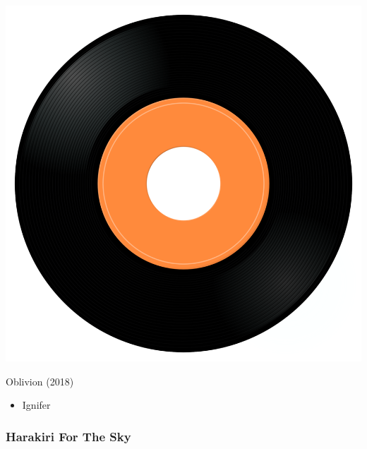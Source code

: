 \begin{minipage}[t]{0.25\textwidth}
\captionsetup{type=figure}
\includegraphics[width=\textwidth]{Images/cover.png}
\caption*{Oblivion (2018)}
\end{minipage}
\begin{minipage}[t]{0.25\textwidth}\vspace{0pt}
\begin{itemize}[nosep,leftmargin=1em,labelwidth=*,align=left]
	\setlength{\itemsep}{0pt}
	\item Ignifer
\end{itemize}
\end{minipage}


\subsubsection{Harakiri For The Sky}

